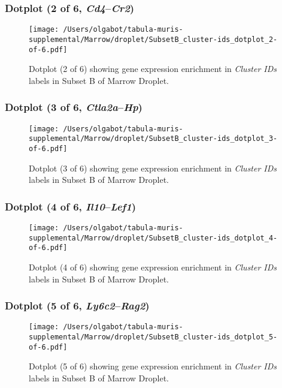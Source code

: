 \clearpage

\subsubsection{Dotplot (2 of 6, \emph{Cd4}--\emph{Cr2})}
\begin{figure}[h]
\centering
\texttt{[image: /Users/olgabot/tabula-muris-supplemental/Marrow/droplet/SubsetB\_cluster-ids\_dotplot\_2-of-6.pdf]}

\caption{ Dotplot (2 of 6)  showing gene expression enrichment in \emph{Cluster IDs} labels in Subset B of Marrow Droplet. }
\end{figure}


\clearpage

\subsubsection{Dotplot (3 of 6, \emph{Ctla2a}--\emph{Hp})}
\begin{figure}[h]
\centering
\texttt{[image: /Users/olgabot/tabula-muris-supplemental/Marrow/droplet/SubsetB\_cluster-ids\_dotplot\_3-of-6.pdf]}

\caption{ Dotplot (3 of 6)  showing gene expression enrichment in \emph{Cluster IDs} labels in Subset B of Marrow Droplet. }
\end{figure}


\clearpage

\subsubsection{Dotplot (4 of 6, \emph{Il10}--\emph{Lef1})}
\begin{figure}[h]
\centering
\texttt{[image: /Users/olgabot/tabula-muris-supplemental/Marrow/droplet/SubsetB\_cluster-ids\_dotplot\_4-of-6.pdf]}

\caption{ Dotplot (4 of 6)  showing gene expression enrichment in \emph{Cluster IDs} labels in Subset B of Marrow Droplet. }
\end{figure}


\clearpage

\subsubsection{Dotplot (5 of 6, \emph{Ly6c2}--\emph{Rag2})}
\begin{figure}[h]
\centering
\texttt{[image: /Users/olgabot/tabula-muris-supplemental/Marrow/droplet/SubsetB\_cluster-ids\_dotplot\_5-of-6.pdf]}

\caption{ Dotplot (5 of 6)  showing gene expression enrichment in \emph{Cluster IDs} labels in Subset B of Marrow Droplet. }
\end{figure}


